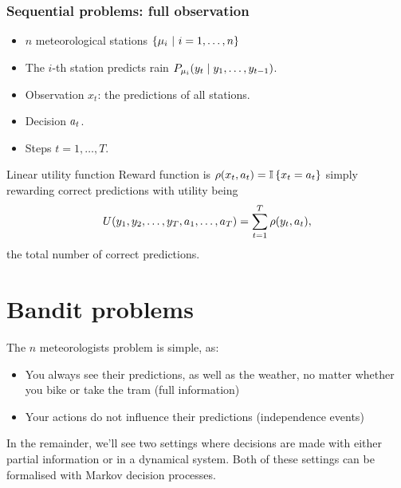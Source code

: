 \documentclass[9pt]{beamer}
\begin{document}
\begin{frame}
  \frametitle{Sequential problems: full observation}
  \begin{example}
    \begin{itemize}
    \item $n$ meteorological stations $\left\{\mu_i ~\middle|~ i=1, \ldots,n\right\}$
    \item The $i$-th station predicts rain $P_{\mu_i}(y_t \mid y_1, \ldots, y_{t-1})$.
    \end{itemize}
  \end{example}
  \begin{itemize}
  \item Observation $x_t$: the predictions of all stations.
  \item Decision $a_t$.
  \item Steps $t = 1, \ldots, T$.
  \end{itemize}

  \begin{block}{Linear utility function}
    Reward function is $\rho(x_t, a_t) = \mathop{\mbox{\ensuremath{\mathbb{I}}}}\left\{x_t = a_t\right\}$ simply rewarding correct predictions with utility being
    \[
      U(y_1, y_2, \ldots, y_T, a_1, \ldots, a_T)
      = 
      \sum_{t=1}^T \rho(y_t, a_t),
    \]
    the total number of correct predictions.
  \end{block}

\end{frame}


\section{Bandit problems}
\label{sec:exp-design-bandit}

\begin{frame}

  The $n$ meteorologists problem is simple, as:

  \begin{itemize}
  \item You always see their predictions, as well as the weather, no matter whether you bike or take the tram (full information)
  \item Your actions do not influence their predictions (independence events)
  \end{itemize}
  
  In the remainder, we'll see two settings where decisions are made with either \alert{partial information} or in a \alert{dynamical system}. Both of these settings can be formalised with Markov decision processes.

\end{frame}
\end{document}
